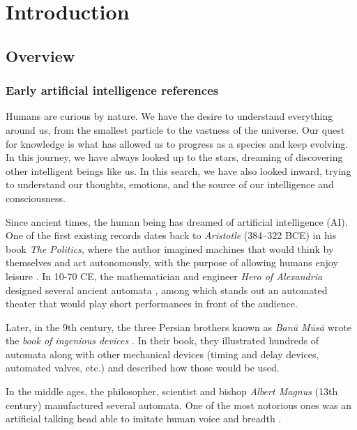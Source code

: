
\chapter{Introduction} \label{ch:introduction}

\section{Overview}

\subsection{Early artificial intelligence references}
Humans are curious by nature. We have the desire to understand everything around us, from the smallest particle to the vastness of the universe. Our quest for knowledge is what has allowed us to progress as a species and keep evolving. In this journey, we have always looked up to the stars, dreaming of discovering other intelligent beings like us. In this search, we have also looked inward, trying to understand our thoughts, emotions, and the source of our intelligence and consciousness. 

Since ancient times, the human being has dreamed of artificial intelligence (AI). One of the first existing records dates back to \textit{Aristotle} (384–322 BCE) in his book \textit{The Politics}, where the author imagined machines that would think by themselves and act autonomously, with the purpose of allowing humans enjoy leisure \autocite{nils2009}. In 10-70 CE, the mathematician and engineer \textit{Hero of Alexandria} designed several ancient automata \autocite{greenwood1851}, among which stands out an automated theater that would play short performances in front of the audience.

Later, in the 9th century, the three Persian brothers known as \textit{Banū Mūsā} wrote the \textit{book of ingenious devices} \autocite{musa1978}. In their book, they illustrated hundreds of automata along with other mechanical devices (timing and delay devices, automated valves, etc.) and described how those would be used. 

In the middle ages, the philosopher, scientist and bishop \textit{Albert Magnus} (13th century) manufactured several automata. One of the most notorious ones was an artificial talking head able to imitate human voice and breadth \autocite{worthies1828}.

